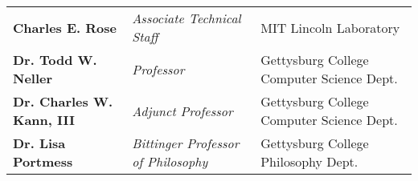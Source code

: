 \documentclass[11pt]{article}
\begin{document}
\begin{tabular}{ l l l }
  	\textbf{Charles E. Rose} & \textit{Associate Technical Staff} & MIT Lincoln Laboratory \\
  	\textbf{Dr. Todd W. Neller} & \textit{Professor} & Gettysburg College Computer Science Dept. \\
  	\textbf{Dr. Charles W. Kann, III} & \textit{Adjunct Professor} & Gettysburg College Computer Science Dept. \\
  	\textbf{Dr. Lisa Portmess} & \textit{Bittinger Professor of Philosophy} & Gettysburg College Philosophy Dept. \\
\end{tabular}
\end{document}
